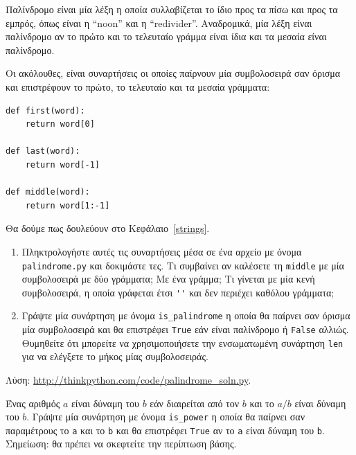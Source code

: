 \documentclass[10pt]{book}
\begin{document}
\begin{exercise}
\label{palindrome}

Παλίνδρομο είναι μία λέξη η οποία συλλαβίζεται το ίδιο προς τα πίσω
και προς τα εμπρός, όπως είναι η ``noon'' και η ``redivider''. 
Αναδρομικά, μία λέξη είναι παλίνδρομο αν το πρώτο και το τελευταίο γράμμα είναι
ίδια και τα μεσαία είναι παλίνδρομο.

Οι ακόλουθες, είναι συναρτήσεις οι οποίες παίρνουν μία συμβολοσειρά
σαν όρισμα και επιστρέφουν το πρώτο, το τελευταίο και τα μεσαία γράμματα:

\begin{verbatim}
def first(word):
    return word[0]

def last(word):
    return word[-1]

def middle(word):
    return word[1:-1]
\end{verbatim}
%

Θα δούμε πως δουλεύουν στο Κεφάλαιο~\ref{strings}.

\begin{enumerate}

\item Πληκτρολογήστε αυτές τις συναρτήσεις μέσα σε ένα αρχείο
με όνομα {\tt palindrome.py} και δοκιμάστε τες. Τι συμβαίνει
αν καλέσετε τη {\tt middle} με μία συμβολοσειρά με δύο γράμματα; 
Με ένα γράμμα; Τι γίνεται με μία κενή συμβολοσειρά, η οποία
γράφεται έτσι \verb"''" και δεν περιέχει καθόλου γράμματα;

\item Γράψτε μία συνάρτηση με όνομα \verb"is_palindrome"
η οποία θα παίρνει σαν όρισμα μία συμβολοσειρά και θα επιστρέφει 
{\tt True} εάν είναι παλίνδρομο ή {\tt False} αλλιώς.
Θυμηθείτε ότι μπορείτε να χρησιμοποιήσετε την ενσωματωμένη συνάρτηση
{\tt len} για να ελέγξετε το μήκος μίας συμβολοσειράς.

\end{enumerate}

Λύση: \url{http://thinkpython.com/code/palindrome_soln.py}.
\\
\end{exercise}


\begin{exercise}

Ένας αριθμός $a$ είναι δύναμη του $b$ εάν
διαιρείται από τον $b$ και το $a/b$ είναι δύναμη
του $b$. Γράψτε μία συνάρτηση με όνομα \verb"is_power"
η οποία θα παίρνει σαν παραμέτρους το {\tt a} και το {\tt b} 
και θα επιστρέφει {\tt True} αν το {\tt a} είναι
δύναμη του {\tt b}. 
Σημείωση: θα πρέπει να σκεφτείτε την περίπτωση βάσης.
\\
\end{exercise}
\end{document}
